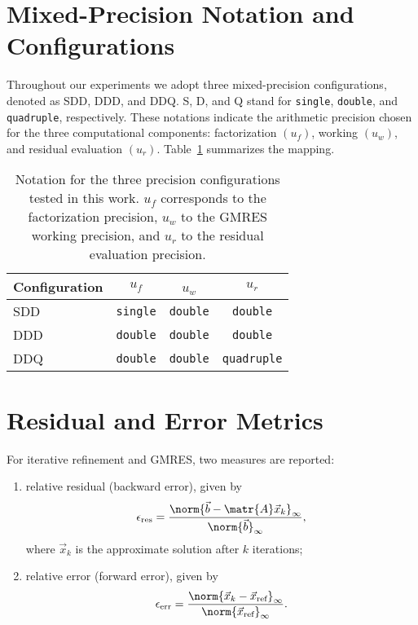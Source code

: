 \section{Mixed-Precision Notation and Configurations}
\label{sec:mixed-prec-notat}

Throughout our experiments we adopt three mixed-precision configurations,
denoted as SDD, DDD, and DDQ. S, D, and Q stand for \texttt{single},
\texttt{double}, and \texttt{quadruple}, respectively. These notations indicate
the arithmetic precision chosen for the three computational components:
factorization \((u_f)\), working \((u_w)\), and residual evaluation \((u_r)\).
Table~\ref{tab:notation} summarizes the mapping.

\begin{table}[h]
  \centering
  \begin{tabular}{lccc}
    \toprule
    Configuration & \(u_f\)    & \(u_w\) ​   & \(u_r\)       \\
    \midrule
    SDD           & \texttt{single} & \texttt{double} & \texttt{double}    \\
    DDD           & \texttt{double} & \texttt{double} & \texttt{double}    \\
    DDQ           & \texttt{double} & \texttt{double} & \texttt{quadruple} \\
    \bottomrule
  \end{tabular}
  \caption[Precision configurations for mixed-precision IR]{Notation for the three
    precision configurations tested in this work. \(u_f\) corresponds to the
    factorization precision, \(u_w\) to the GMRES working precision, and \(u_r\)
    to the residual evaluation precision.}
  \label{tab:notation}
\end{table}


\section{Residual and Error Metrics}
\label{sec:resid-error-metr}

For iterative refinement and GMRES, two measures are reported:
\begin{enumerate}
\item relative residual (backward error), given by \[\epsilon_{\text{res}} =
    \frac{\norm{\vec{b} - \matr{A} \vec{x}_k}_{\infty}}{\norm{\vec{b}}_{\infty}},\] where \(\vec{x}_k\) is the approximate solution
  after \(k\) iterations;
\item relative error (forward error), given by \[\epsilon_{\text{err}} = \frac{\norm{\vec{x}_k -
        \vec{x}_{\text{ref}}}_{\infty}}{\norm{\vec{x}_{\text{ref}}}_{\infty}}.\]
\end{enumerate}

